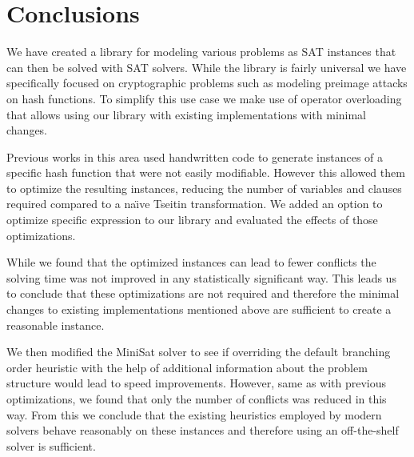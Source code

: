 \section{Conclusions}
We have created a library for modeling various problems as SAT instances that can then be solved with SAT solvers.
While the library is fairly universal we have specifically focused on cryptographic problems such as modeling preimage attacks on hash functions.
To simplify this use case we make use of operator overloading that allows using our library with existing implementations with minimal changes.

Previous works in this area used handwritten code to generate instances of a specific hash function that were not easily modifiable.
However this allowed them to optimize the resulting instances, reducing the number of variables and clauses required compared to a na\"{\i}ve Tseitin transformation.
We added an option to optimize specific expression to our library and evaluated the effects of those optimizations.

While we found that the optimized instances can lead to fewer conflicts the solving time was not improved in any statistically significant way.
This leads us to conclude that these optimizations are not required and therefore the minimal changes to existing implementations mentioned above are sufficient to create a reasonable instance.

We then modified the MiniSat solver to see if overriding the default branching order heuristic with the help of additional information about the problem structure would lead to speed improvements.
However, same as with previous optimizations, we found that only the number of conflicts was reduced in this way.
From this we conclude that the existing heuristics employed by modern solvers behave reasonably on these instances and therefore using an off-the-shelf solver is sufficient.